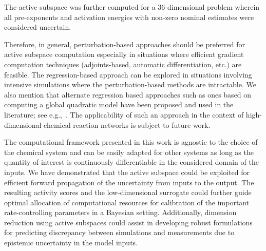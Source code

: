The active subspace was further computed for a 36-dimensional problem
wherein all pre-exponents and activation energies with non-zero nominal
estimates  were considered uncertain. 

Therefore, in general, perturbation-based approaches should be preferred for 
active subspace computation especially in situations where efficient gradient
computation techniques (adjoints-based, automatic differentiation, etc.) are
feasible. The regression-based approach can be explored in situations involving intensive
simulations where the perturbation-based methods are intractable.
%
%
We also mention that alternate regression based approaches such as ones based
on computing a global quadratic model have been proposed and used in the
literature; see e.g.,~\cite{Constantine:2017a}.  The applicability of such an
approach in the context of high-dimensional chemical reaction networks is
subject to future work. 

The computational framework presented in this work is agnostic to the choice of
the chemical system and can be easily adapted for other systems as long
as the quantity of interest is continuously differentiable in the considered
domain of the inputs.  We have demonstrated that the active subspace could be
exploited for efficient forward propagation of the uncertainty from inputs to
the output. The resulting activity scores and the low-dimensional surrogate
could further guide optimal allocation of computational resources for
calibration of the important rate-controlling parameters 
 in a Bayesian setting.
Additionally, dimension reduction using active subspaces could assist in
developing robust formulations for predicting discrepancy between simulations
and measurements due to epistemic uncertainty in the model inputs.
